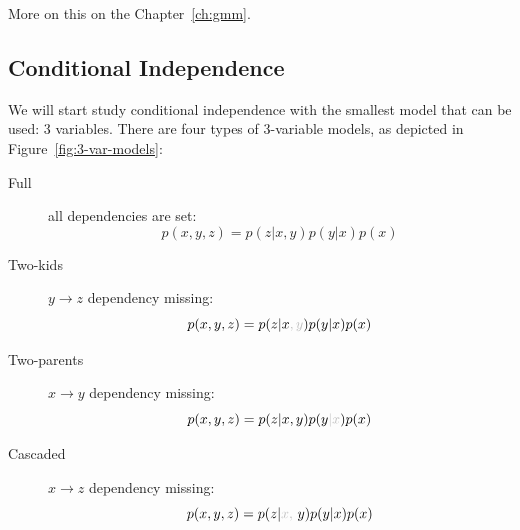 


 More on this on the Chapter~\ref{ch:gmm}.

\subsection{Conditional Independence}


We will start study conditional independence with the smallest model that can be used: 3 variables. There are four types of 3-variable models, as depicted in Figure~\ref{fig:3-var-models}:
\begin{description}
    \item[Full] all dependencies are set:
    \begin{equation}
    p(x,y,z) = p(z|x,y)p(y|x)p(x)
    \end{equation}
    \item[Two-kids] $y\rightarrow z$ dependency missing:
    \begin{equation}
    p(x,y,z) = p(z|x{\color{lightgray},y})p(y|x)p(x)
    \end{equation}
    \item[Two-parents] $x\rightarrow y$ dependency missing:
    \begin{equation}
    p(x,y,z) = p(z|x,y)p(y{\color{lightgray}|x})p(x)
    \end{equation}
    \item[Cascaded] $x\rightarrow z$ dependency missing:
    \begin{equation}
    p(x,y,z) = p(z|{\color{lightgray}x,}\ y)p(y|x)p(x)
    \end{equation}
\end{description}

